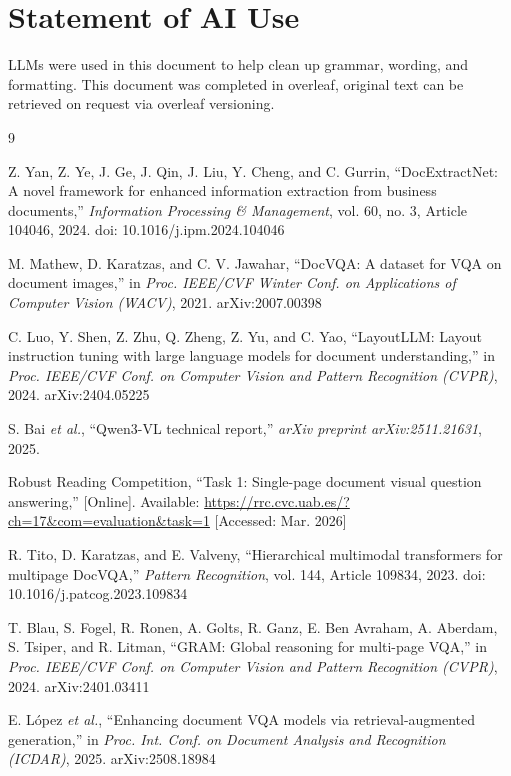 \documentclass[12pt, a4paper]{article}
\begin{document}
\newpage

\section*{Statement of AI Use}
LLMs were used in this document to help clean up grammar, wording, and formatting. This document was completed in overleaf, original text can be retrieved on request via overleaf versioning.

\begin{thebibliography}{9}

Z. Yan, Z. Ye, J. Ge, J. Qin, J. Liu, Y. Cheng, and C. Gurrin, ``DocExtractNet: A novel framework for enhanced information extraction from business documents,'' \textit{Information Processing \& Management}, vol. 60, no. 3, Article 104046, 2024. doi: 10.1016/j.ipm.2024.104046

M. Mathew, D. Karatzas, and C. V. Jawahar, ``DocVQA: A dataset for VQA on document images,'' in \textit{Proc. IEEE/CVF Winter Conf. on Applications of Computer Vision (WACV)}, 2021. arXiv:2007.00398

C. Luo, Y. Shen, Z. Zhu, Q. Zheng, Z. Yu, and C. Yao, ``LayoutLLM: Layout instruction tuning with large language models for document understanding,'' in \textit{Proc. IEEE/CVF Conf. on Computer Vision and Pattern Recognition (CVPR)}, 2024. arXiv:2404.05225

S. Bai \textit{et al.}, ``Qwen3-VL technical report,'' \textit{arXiv preprint arXiv:2511.21631}, 2025.

Robust Reading Competition, ``Task 1: Single-page document visual question answering,'' [Online]. Available: \url{https://rrc.cvc.uab.es/?ch=17&com=evaluation&task=1} [Accessed: Mar. 2026]

R. Tito, D. Karatzas, and E. Valveny, ``Hierarchical multimodal transformers for multipage DocVQA,'' \textit{Pattern Recognition}, vol. 144, Article 109834, 2023. doi: 10.1016/j.patcog.2023.109834

T. Blau, S. Fogel, R. Ronen, A. Golts, R. Ganz, E. Ben Avraham, A. Aberdam, S. Tsiper, and R. Litman, ``GRAM: Global reasoning for multi-page VQA,'' in \textit{Proc. IEEE/CVF Conf. on Computer Vision and Pattern Recognition (CVPR)}, 2024. arXiv:2401.03411

E. López \textit{et al.}, ``Enhancing document VQA models via retrieval-augmented generation,'' in \textit{Proc. Int. Conf. on Document Analysis and Recognition (ICDAR)}, 2025. arXiv:2508.18984


\end{thebibliography}
\end{document}

